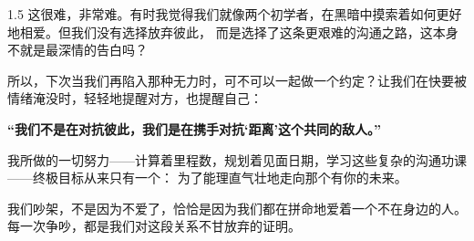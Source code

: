 \begin{spacing}{1.5}
    这很难，非常难。有时我觉得我们就像两个初学者，在黑暗中摸索着如何更好地相爱。但我们没有选择放弃彼此，
    而是选择了这条更艰难的沟通之路，这本身不就是最深情的告白吗？

    所以，下次当我们再陷入那种无力时，可不可以一起做一个约定？让我们在快要被情绪淹没时，轻轻地提醒对方，也提醒自己：

    \textbf{“我们不是在对抗彼此，我们是在携手对抗‘距离’这个共同的敌人。”}

    我所做的一切努力——计算着里程数，规划着见面日期，学习这些复杂的沟通功课——终极目标从来只有一个：
    为了能理直气壮地走向那个有你的未来。

    我们吵架，不是因为不爱了，恰恰是因为我们都在拼命地爱着一个不在身边的人。
    每一次争吵，都是我们对这段关系不甘放弃的证明。

    
\end{spacing}

\clearpage 

\subtitle{序章，及我们}

\history

\clearpage

\subtitle{写给未来的我们}

